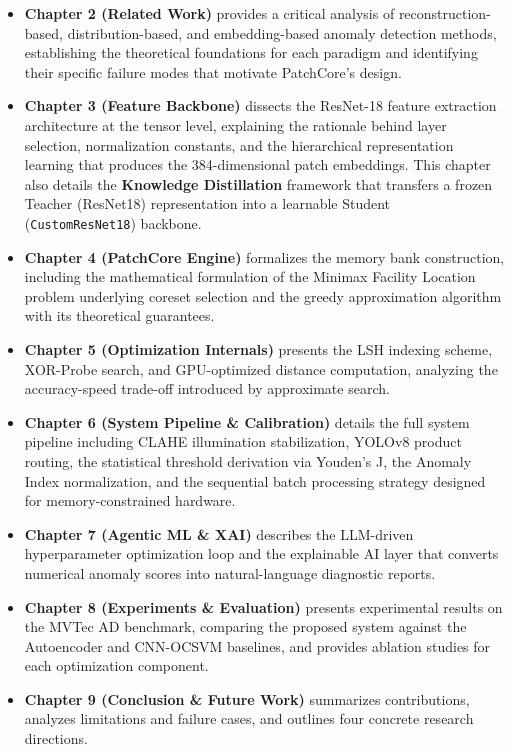 \documentclass[12pt, a4paper, oneside]{report}
\begin{document}
\begin{itemize}
\item
  \textbf{Chapter 2 (Related Work)} provides a critical analysis of reconstruction-based, distribution-based, and embedding-based anomaly detection methods, establishing the theoretical foundations for each paradigm and identifying their specific failure modes that motivate PatchCore's design.
\item
  \textbf{Chapter 3 (Feature Backbone)} dissects the ResNet-18 feature extraction architecture at the tensor level, explaining the rationale behind layer selection, normalization constants, and the hierarchical representation learning that produces the 384-dimensional patch embeddings. This chapter also details the \textbf{Knowledge Distillation} framework that transfers a frozen Teacher (ResNet18) representation into a learnable Student (\texttt{CustomResNet18}) backbone.
\item
  \textbf{Chapter 4 (PatchCore Engine)} formalizes the memory bank construction, including the mathematical formulation of the Minimax Facility Location problem underlying coreset selection and the greedy approximation algorithm with its theoretical guarantees.
\item
  \textbf{Chapter 5 (Optimization Internals)} presents the LSH indexing scheme, XOR-Probe search, and GPU-optimized distance computation, analyzing the accuracy-speed trade-off introduced by approximate search.
\item
  \textbf{Chapter 6 (System Pipeline \& Calibration)} details the full system pipeline including CLAHE illumination stabilization, YOLOv8 product routing, the statistical threshold derivation via Youden's J, the Anomaly Index normalization, and the sequential batch processing strategy designed for memory-constrained hardware.
\item
  \textbf{Chapter 7 (Agentic ML \& XAI)} describes the LLM-driven hyperparameter optimization loop and the explainable AI layer that converts numerical anomaly scores into natural-language diagnostic reports.
\item
  \textbf{Chapter 8 (Experiments \& Evaluation)} presents experimental results on the MVTec AD benchmark, comparing the proposed system against the Autoencoder and CNN-OCSVM baselines, and provides ablation studies for each optimization component.
\item
  \textbf{Chapter 9 (Conclusion \& Future Work)} summarizes contributions, analyzes limitations and failure cases, and outlines four concrete research directions.
\end{itemize}
\end{document}

